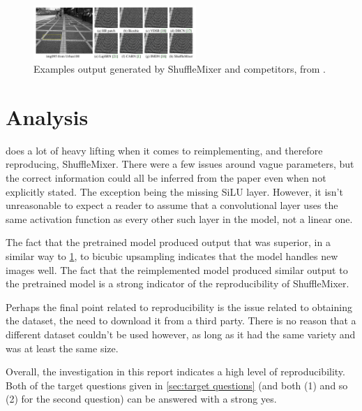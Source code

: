 \documentclass{article}
\begin{document}
    \begin{figure}
        \centering
        \includegraphics[width=0.55\textwidth]{pavement.png}
        \caption{Examples output generated by ShuffleMixer and competitors, from \citet{sun2022shufflemixer}.} \label{fig:original_output}
    \end{figure}
    
    \section{Analysis}

     does a lot of heavy lifting when it comes to reimplementing, and therefore reproducing, ShuffleMixer. There were a few issues around vague parameters, but the correct information could all be inferred from the paper even when not explicitly stated. The exception being the missing SiLU layer. However, it isn't unreasonable to expect a reader to assume that a convolutional layer uses the same activation function as every other such layer in the model, not a linear one.

    The fact that the pretrained model produced output that was superior, in a similar way to \cref{fig:original_output}, to bicubic upsampling indicates that the model handles new images well. The fact that the reimplemented model produced similar output to the pretrained model is a strong indicator of the reproducibility of ShuffleMixer.

    Perhaps the final point related to reproducibility is the issue related to obtaining the dataset, the need to download it from a third party. There is no reason that a different dataset couldn't be used however, as long as it had the same variety and was at least the same size.

    Overall, the investigation in this report indicates a high level of reproducibility. Both of the target questions given in \cref{sec:target questions} (and both (1) and so (2) for the second question) can be answered with a strong yes.


    
    

    \newpage
\end{document}
